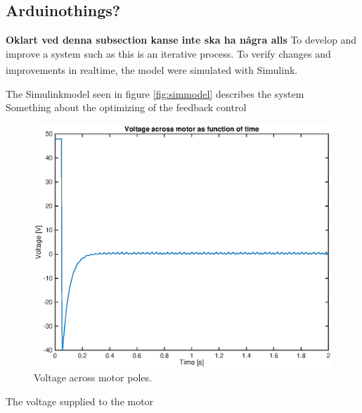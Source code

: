 \documentclass[a4paper,11pt]{kth-mag}
\begin{document}
\subsection{Arduinothings?}
\textbf{Oklart ved denna subsection kanse inte ska ha några alls}
To develop and improve a system such as this is an iterative process. To verify changes and improvements in realtime, the model were simulated with Simulink\textsuperscript{\textregistered}. 



The Simulinkmodel seen in figure \ref{fig:simmodel} describes the system
\\ Something about the  optimizing of the feedback control
\begin{figure}[!htb]
\centering
\includegraphics[scale=.7]{voltageplot.eps}
\caption{Voltage across motor poles.}
\label{fig:voltageplot}
\end{figure}

The voltage supplied to the motor
\end{document}
